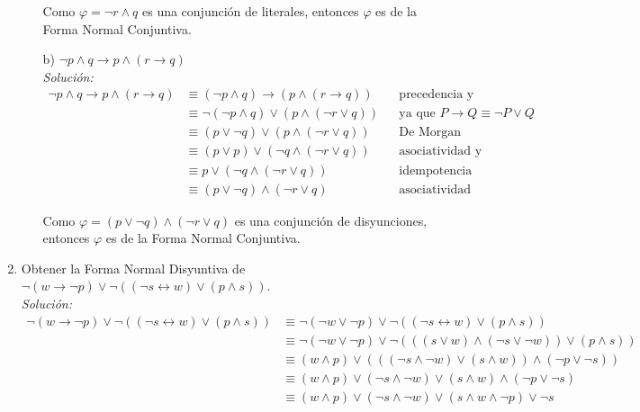 \documentclass[letterpaper,11pt]{article}
\begin{document}
\begin{enumerate}
\begin{itemize}
            Como $\varphi = \neg r \land q$ es una conjunción de literales, 
            entonces $\varphi$ es de la Forma Normal Conjuntiva.

            \item[b)] $\neg p \land q \rightarrow p \land (r \rightarrow q)$ \\
            \textit{Solución:} 
            \begin{align*}
                \neg p \land q \rightarrow p \land (r \rightarrow q)
                &\equiv (\neg p \land q) \rightarrow (p \land (r \rightarrow q))
                && \text{precedencia y asociatividad de conectivos} \\
                &\equiv \neg (\neg p \land q) \lor (p \land (\neg r \lor q))
                && \text{{ya que $P \rightarrow Q \equiv \neg P \lor Q$}} \\
                &\equiv (p \lor \neg q) \lor (p \land (\neg r \lor q))
                && \text{De Morgan} \\
                &\equiv (p \lor p) \lor (\neg q \land (\neg r \lor q))
                && \text{asociatividad y conmutatividad} \\
                &\equiv p \lor (\neg q \land (\neg r \lor q))
                && \text{idempotencia} \\
                &\equiv (p \lor \neg q) \land (\neg r \lor q)
                && \text{asociatividad}
            \end{align*}

            Como $\varphi =  (p \lor \neg q) \land (\neg r \lor q)$ es una 
            conjunción de disyunciones, entonces $\varphi$ es de la Forma 
            Normal Conjuntiva.
             
        \end{itemize}

        \item Obtener la Forma Normal Disyuntiva de 
        $\neg (w \rightarrow \neg p) \lor \neg ((\neg s \leftrightarrow w) 
        \lor (p \land s))$. \\
        \textit{Solución:} 
        \begin{align*}
            \neg (w \rightarrow \neg p) \lor \neg ((\neg s \leftrightarrow w) 
            \lor (p \land s))
            &\equiv \neg (\neg w \lor \neg p) \lor 
            \neg ((\neg s \leftrightarrow w) \lor (p \land s)) \\
            &\equiv \neg (\neg w \lor \neg p) \lor 
            \neg (((s \lor w) \land (\neg s \lor \neg w)) \lor (p \land s)) \\
            &\equiv (w \land p) \lor (((\neg s \land \neg w) \lor 
            (s \land w)) \land (\neg p \lor \neg s)) \\
            &\equiv (w \land p) \lor (\neg s \land \neg w) \lor (s \land w)
            \land (\neg p \lor \neg s) \\
            &\equiv (w \land p) \lor (\neg s \land \neg w) \lor (s \land w
            \land \neg p) \lor \neg s
        \end{align*}


\end{enumerate}
\end{document}
